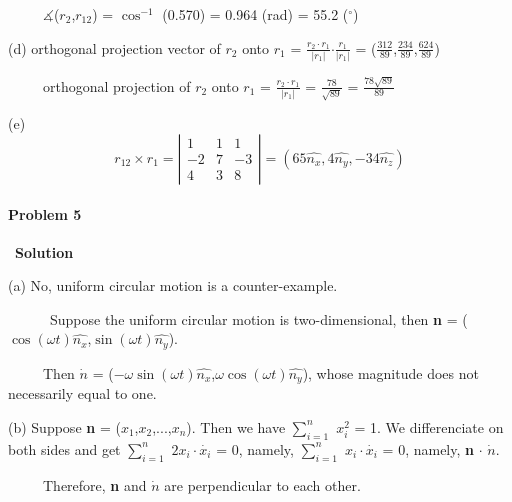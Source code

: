 \documentclass[12pt,a4paper]{article}
\begin{document}
\par \ \ \ \ \ $\measuredangle$(\textbf{$r_2$},\textbf{$r_{12}$}) = $\cos^{-1}$ (0.570) = 0.964 (rad) = 55.2 ($^\circ$)
\vspace{2mm}
\par (d) orthogonal projection vector of \textbf{$r_2$} onto \textbf{$r_1$} = $\frac{\textbf{$r_2$}\cdot\textbf{$r_1$}}{\lvert\textbf{$r_1$}\rvert}$$\cdot$$\frac{\textbf{$r_1$}}{\lvert\textbf{$r_1$}\rvert}$ = ($\frac{312}{89}$,$\frac{234}{89}$,$\frac{62
4}{89}$)
\par \ \ \ \ \ orthogonal projection of \textbf{$r_2$} onto \textbf{$r_1$} = $\frac{\textbf{$r_2$}\cdot\textbf{$r_1$}}{\lvert\textbf{$r_1$}\rvert}$ = $\frac{78}{\sqrt{89}}$ = $\frac{78\sqrt{89}}{89}$
\vspace{2mm}
\par (e) 
\begin{equation*}
\textbf{$r_{12}$} \times \textbf{$r_1$} = {
\left| \begin{array}{ccc}
1 & 1 & 1\\
-2 & 7 & -3\\
4 & 3 & 8
\end{array} 
\right |}
= (65\hat{n_x},4\hat{n_y},-34\hat{n_z})
\end{equation*}

\paragraph{\large \textbf{Problem 5}}~{\textbf{Solution}}
\vspace{2mm}
\par (a) No, uniform circular motion is a counter-example.
\par \ \ \ \ \ \ Suppose the uniform circular motion is two-dimensional, then \textbf{n} = ($\cos(\omega t)\hat{n_x}$,$\sin(\omega t)\hat{n_y}$).
\par \ \ \ \ \ Then \textbf{$\dot{n}$} = ($-\omega\sin(\omega t)\hat{n_x}$,$\omega\cos(\omega t)\hat{n_y}$), whose magnitude does not necessarily equal to one.
\vspace{2mm}
\par (b) Suppose \textbf{n} = ($x_1$,$x_2$,...,$x_n$). Then we have $\sum\limits_{i=1}^n$ $x_i^2$ = 1. We differenciate on both sides and get $\sum\limits_{i=1}^n$ $2x_i\cdot\dot{x_i}$ = 0, namely, $\sum\limits_{i=1}^n$ $x_i\cdot\dot{x_i}$ = 0, namely, \textbf{n} $\cdot$ \textbf{$\dot{n}$}.
\par \ \ \ \ \ Therefore, \textbf{n} and \textbf{$\dot{n}$} are perpendicular to each other.
\end{document}
